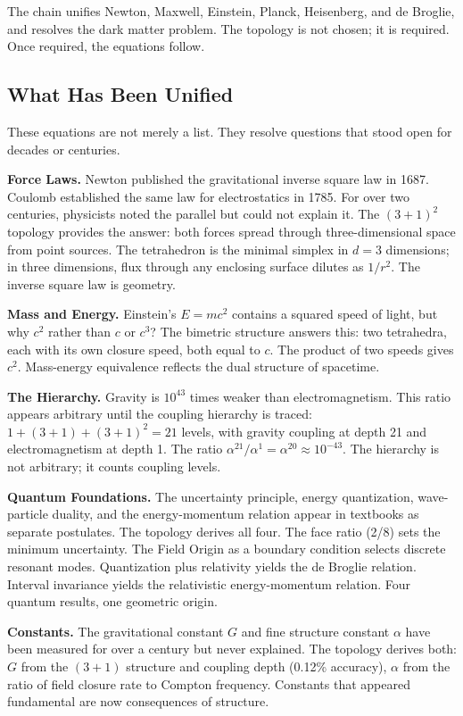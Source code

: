 \documentclass[aps,prd,preprint,superscriptaddress,showpacs,preprintnumbers,amsmath,amssymb,nofootinbib]{revtex4-2}
\begin{document}
The chain unifies Newton, Maxwell, Einstein, Planck, Heisenberg, and de Broglie, and resolves the dark matter problem. The topology is not chosen; it is required. Once required, the equations follow.

\subsection{What Has Been Unified}
\label{subsec:unifications}

These equations are not merely a list. They resolve questions that stood open for decades or centuries.

\textbf{Force Laws.} Newton published the gravitational inverse square law in 1687. Coulomb established the same law for electrostatics in 1785. For over two centuries, physicists noted the parallel but could not explain it. The $(3+1)^2$ topology provides the answer: both forces spread through three-dimensional space from point sources. The tetrahedron is the minimal simplex in $d = 3$ dimensions; in three dimensions, flux through any enclosing surface dilutes as $1/r^2$. The inverse square law is geometry.

\textbf{Mass and Energy.} Einstein's $E = mc^2$ contains a squared speed of light, but why $c^2$ rather than $c$ or $c^3$? The bimetric structure answers this: two tetrahedra, each with its own closure speed, both equal to $c$. The product of two speeds gives $c^2$. Mass-energy equivalence reflects the dual structure of spacetime.

\textbf{The Hierarchy.} Gravity is $10^{43}$ times weaker than electromagnetism. This ratio appears arbitrary until the coupling hierarchy is traced: $1 + (3+1) + (3+1)^2 = 21$ levels, with gravity coupling at depth 21 and electromagnetism at depth 1. The ratio $\alpha^{21}/\alpha^{1} = \alpha^{20} \approx 10^{-43}$. The hierarchy is not arbitrary; it counts coupling levels.

\textbf{Quantum Foundations.} The uncertainty principle, energy quantization, wave-particle duality, and the energy-momentum relation appear in textbooks as separate postulates. The topology derives all four. The face ratio (2/8) sets the minimum uncertainty. The Field Origin as a boundary condition selects discrete resonant modes. Quantization plus relativity yields the de Broglie relation. Interval invariance yields the relativistic energy-momentum relation. Four quantum results, one geometric origin.

\textbf{Constants.} The gravitational constant $G$ and fine structure constant $\alpha$ have been measured for over a century but never explained. The topology derives both: $G$ from the $(3+1)$ structure and coupling depth (0.12\% accuracy), $\alpha$ from the ratio of field closure rate to Compton frequency. Constants that appeared fundamental are now consequences of structure.
\end{document}
